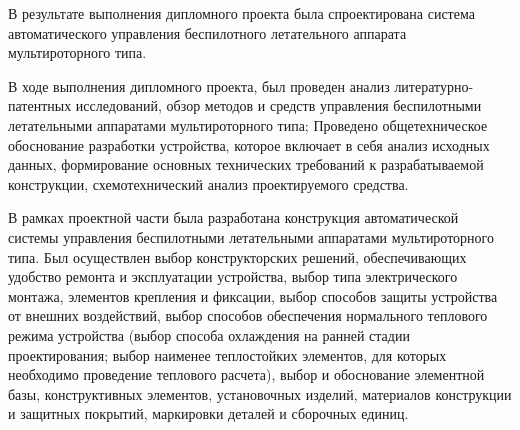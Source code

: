 
В результате выполнения дипломного проекта была спроектирована система
автоматического управления беспилотного летательного аппарата
мультироторного типа.

В ходе выполнения дипломного проекта, был проведен анализ
литературно-патентных исследований, обзор методов и средств управления
беспилотными летательными аппаратами мультироторного типа;
Проведено общетехническое обоснование разработки устройства, которое
включает в себя анализ исходных данных, формирование основных
технических требований к разрабатываемой конструкции, схемотехнический
анализ проектируемого средства.

В рамках проектной части была разработана конструкция автоматической
системы управления беспилотными летательными аппаратами
мультироторного типа.
Был осуществлен выбор конструкторских решений, обеспечивающих удобство
ремонта и эксплуатации устройства, выбор типа электрического монтажа,
элементов крепления и фиксации, выбор способов защиты устройства от
внешних воздействий, выбор способов обеспечения нормального теплового
режима устройства (выбор способа охлаждения на ранней стадии
проектирования; выбор наименее теплостойких элементов, для которых
необходимо проведение теплового расчета), выбор и обоснование
элементной базы, конструктивных элементов, установочных изделий,
материалов конструкции и защитных покрытий, маркировки деталей и
сборочных единиц.

\newpage

\renewcommand{\refname}{\textbf{Cписок использованных источников}}
\printbibliography[heading=bibintoc, title={Cписок использованных источников}]

\newpage

\newpage

\newpage

\newpage

\newpage

